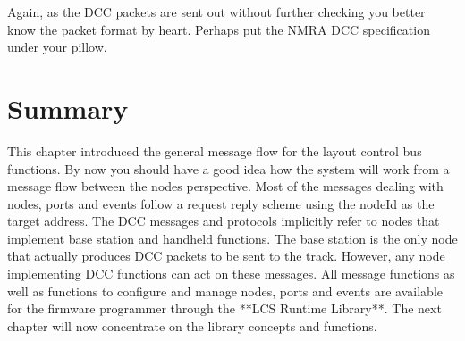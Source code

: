 Again, as the DCC packets are sent out without further checking you better know the packet format by heart. Perhaps put the NMRA DCC specification under your pillow.

\section{Summary}

This chapter introduced the general message flow for the layout control bus functions. By now you should have a good idea how the system will work from a message flow between the nodes perspective. Most of the messages dealing with nodes, ports and events follow a request reply scheme using the nodeId as the target address. The DCC messages and protocols implicitly refer to nodes that implement base station and handheld functions. The base station is the only node that actually produces DCC packets to be sent to the track. However, any node implementing DCC functions can act on these messages. All message functions as well as functions to configure and manage nodes, ports and events are available for the firmware programmer through the **LCS Runtime Library**. The next chapter will now concentrate on the library concepts and functions.

